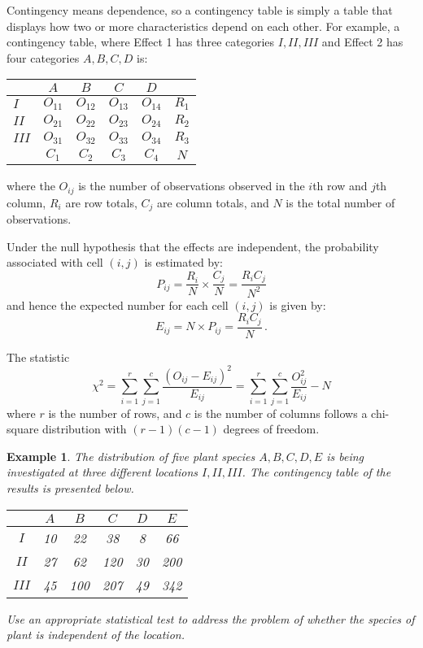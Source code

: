 \documentclass[12pt]{article}
\newtheorem{example}[theorem]{Example}
\begin{document}
Contingency means dependence, so a contingency table is simply a table that displays how two or more characteristics depend on each other.  For example, a contingency table, where Effect 1 has three categories $I, II, III$ and Effect 2 has four categories $A, B, C, D$ is:
\begin{center}
\begin{tabular}{|l|c|c|c|c|c|}
  \hline
   & $A$ & $B$ & $C$ & $D$ &  \\ \hline
  $I$ & $O_{11}$ & $O_{12}$ & $O_{13}$ & $O_{14}$ & $R_{1}$ \\
  $II$ & $O_{21}$ & $O_{22}$ & $O_{23}$ & $O_{24}$ & $R_{2}$ \\
  $III$ & $O_{31}$ & $O_{32}$ & $O_{33}$ & $O_{34}$& $R_{3}$ \\ \hline
   & $C_{1}$ & $C_{2}$ & $C_{3}$ & $C_{4}$ & $N$ \\
  \hline
\end{tabular}
\end{center}
where the $O_{ij}$ is the number of observations observed in the $i$th row and $j$th column, $R_{i}$ are row totals, $C_{j}$ are column totals, and $N$ is the total number of observations.

Under the null hypothesis that the effects are independent, the probability associated with cell $(i,j)$ is estimated by:
$$
P_{ij}=\frac{R_{i}}{N}\times\frac{C_{j}}{N}=\frac{R_{i}C_{j}}{N^{2}}
$$
and hence the expected number for each cell $(i,j)$ is given by:
$$
E_{ij}=N \times P_{ij}=\frac{R_{i}C_{j}}{N} \,.
$$

The statistic
$$
\chi^{2}=\sum_{i=1}^{r}\sum_{j=1}^{c}\frac{(O_{ij}-E_{ij})^{2}}{E_{ij}}=\sum_{i=1}^{r}\sum_{j=1}^{c}\frac{O_{ij}^{2}}{E_{ij}}-N
$$
where $r$ is the number of rows, and $c$ is the number of columns follows a chi-square distribution with $(r-1)(c-1)$ degrees of freedom.

\begin{example}
The distribution of five plant species $A, B, C, D, E$ is being investigated at three different locations $I, II, III$. The contingency table of the results is presented below.
\begin{center}
\begin{tabular}{|c|c|c|c|c|c|}
               \hline
                & $A$ & $B$ & $C$ & $D$ & $E$ \\ \hline
               $I$ & 10 & 22 & 38 & 8 & 66 \\
               $II$ & 27 & 62 & 120 & 30 & 200 \\
               $III$ & 45 & 100 & 207 & 49 & 342 \\
               \hline
\end{tabular}
\end{center}
Use an appropriate statistical test to address the problem of whether the species of plant is independent of the location.
\end{example}
\end{document}
